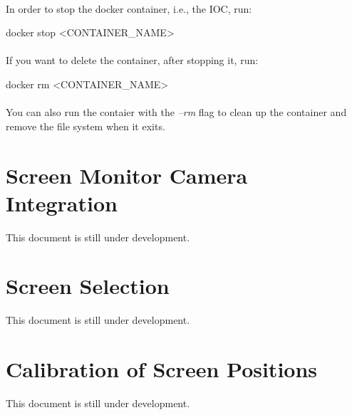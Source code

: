 \documentclass[openany]{article}
\begin{document}
        \paragraph{} In order to stop the docker container, i.e., the IOC, run:

        \vspace{1mm}
        \begin{code}
docker stop <CONTAINER_NAME>
        \end{code}
        \vspace{1mm}

        \paragraph{} If you want to delete the container, after stopping it, run:

        \vspace{1mm}
        \begin{code}
docker rm <CONTAINER_NAME>
        \end{code}
        \vspace{1mm}

        \paragraph{} You can also run the contaier with the \emph{--rm} flag to clean up the container and remove the file system when it exits.

\section{Screen Monitor Camera Integration}\label{sec:dev-reference-frame}

    This document is still under development.

\section{Screen Selection}

    This document is still under development.

\section{Calibration of Screen Positions}

    This document is still under development.
\end{document}

